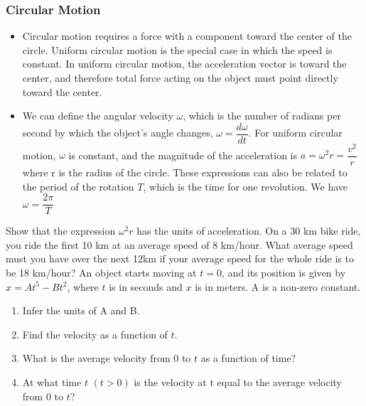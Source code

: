 \documentclass[12pt,addpoints]{exam}
\begin{document}
\begin{center}
		\subsubsection*{Circular Motion}
		\begin{itemize}
			\item Circular motion requires a force with a component toward the center of the circle. Uniform circular motion is the special case in which the speed is constant. In uniform circular motion, the acceleration vector is toward the center, and therefore total force acting on the object must point directly toward the center.
			\item We can define the angular velocity $\omega$, which is the number of radians per second by which the object’s angle changes, $\omega=\dfrac{d\omega}{dt}$. For uniform circular motion, $\omega$ is constant, and the magnitude of the acceleration is $a=\omega^2r=\dfrac{v^2}{r}$ where r is the radius of the circle. These expressions can also be related to the period of the rotation $T$, which is the time for one revolution. We have $\omega=\dfrac{2\pi}{T}$
		\end{itemize}
		\begin{questions}
            \question Show that the expression $\omega^2 r$ has the units of acceleration.\vspace{0.7in}
			\question On a 30 km bike ride, you ride the first 10 km at an average speed of 8 km/hour. What average speed must you have over the next 12km if your average speed for the whole ride is to be 18 km/hour?\vspace{1.3in}
			\question An object starts moving at $t = 0$, and its position is given by $x = At^5 - Bt^2$, where $t$ is in seconds and $x$ is in meters. A is a non-zero constant.
			\begin{enumerate}[label=(\alph*)]
				\item Infer the units of A and B.\vspace{0.8in}
				\item Find the velocity as a function of $t$.\vspace{1in}
				\item What is the average velocity from $0$ to $t$ as a
				function of time?\vspace{1in}
				\item At what time $t$ $(t > 0)$ is the velocity at t
				equal to the average velocity from $0$ to $t$?\vspace{1in}
			\end{enumerate}

\end{questions}
\end{center}
\end{document}
